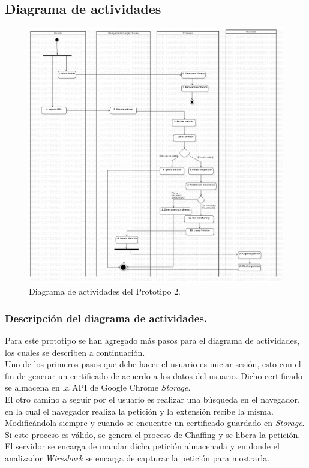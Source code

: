 \documentclass[12pt, a4paper, titlepage]{report}
\begin{document}
    		\subsection{Diagrama de actividades}
    		    \begin{figure}[H]
    				\begin{center}	\includegraphics[width=15cm]{./imagenes/Desarrollo/Prototipo_2/DA_P2.png}
    					\caption{Diagrama de actividades del Prototipo 2.}
    				\end{center}
    			\end{figure}
    		
        		\subsubsection{Descripción del diagrama de actividades.}
        		Para este prototipo se han agregado más pasos para el diagrama de actividades, los cuales se describen a 
            	continuación.\\
            	Uno de los primeros pasos que debe hacer el usuario es iniciar sesión, esto con el fin de generar un certificado de acuerdo a los datos del usuario. Dicho certificado se almacena en la API de Google Chrome \textit{Storage}. \\
            	El otro camino a seguir por el usuario es realizar una búsqueda en el navegador, en la cual el navegador realiza la petición y la extensión recibe la misma. Modificándola siempre y cuando se encuentre un certificado guardado en \textit{Storage}. Si este proceso es válido, se genera el proceso de Chaffing y se libera la petición. El servidor se encarga de mandar dicha petición almacenada y en donde el analizador \textit{Wireshark} se encarga de capturar la petición para mostrarla.
			
\end{document}
